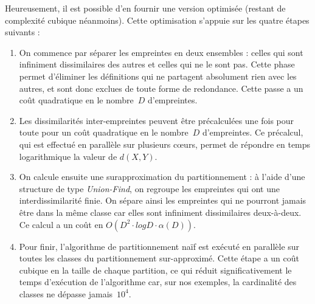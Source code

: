 Heureusement, il est possible d'en fournir une version optimisée
(restant de complexité cubique néanmoins). Cette optimisation
s'appuie sur les quatre étapes suivants :

\begin{enumerate}
\item
  On commence par séparer les empreintes en deux ensembles : celles
  qui sont infiniment dissimilaires des autres et celles qui ne le
  sont pas. Cette phase permet d'éliminer les définitions qui ne
  partagent absolument rien avec les autres, et sont donc exclues de
  toute forme de redondance. Cette passe a un coût quadratique en le
  nombre~$D$ d'empreintes.
\item
  Les dissimilarités inter-empreintes peuvent être précalculées une
  fois pour toute pour un coût quadratique en le nombre~$D$
  d'empreintes.  Ce précalcul, qui est effectué en parallèle sur
  plusieurs c{\oe}urs, permet de répondre en temps logarithmique
  la valeur de $d(X, Y)$.
\item
  On calcule ensuite une surapproximation du partitionnement : à l'aide
  d'une structure de type \textit{Union-Find}, on regroupe les
  empreintes qui ont une interdissimilarité finie. On sépare ainsi
  les empreintes qui ne pourront jamais être dans la même classe car
  elles sont infiniment dissimilaires deux-à-deux. Ce calcul a un coût
  en $O(D^2 \cdot log D \cdot \alpha(D))$. 
\item
  Pour finir, l'algorithme de partitionnement naïf est exécuté en
  parallèle sur toutes les classes du partitionnement sur-approximé.
  Cette étape a un coût cubique en la taille de chaque partition, ce
  qui réduit significativement le temps d'exécution de l'algorithme
  car, sur nos exemples, la cardinalité des classes ne dépasse
  jamais~$10^4$.

\end{enumerate}
